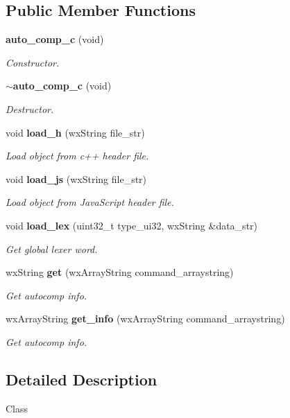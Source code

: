 \subsection*{Public Member Functions}
\begin{DoxyCompactItemize}
\item 
\textbf{ auto\+\_\+comp\+\_\+c} (void)
\begin{DoxyCompactList}\small\item\em Constructor. \end{DoxyCompactList}\item 
\textbf{ $\sim$auto\+\_\+comp\+\_\+c} (void)
\begin{DoxyCompactList}\small\item\em Destructor. \end{DoxyCompactList}\item 
void \textbf{ load\+\_\+h} (wx\+String file\+\_\+str)
\begin{DoxyCompactList}\small\item\em Load object from c++ header file. \end{DoxyCompactList}\item 
void \textbf{ load\+\_\+js} (wx\+String file\+\_\+str)
\begin{DoxyCompactList}\small\item\em Load object from Java\+Script header file. \end{DoxyCompactList}\item 
void \textbf{ load\+\_\+lex} (uint32\+\_\+t type\+\_\+ui32, wx\+String \&data\+\_\+str)
\begin{DoxyCompactList}\small\item\em Get global lexer word. \end{DoxyCompactList}\item 
wx\+String \textbf{ get} (wx\+Array\+String command\+\_\+arraystring)
\begin{DoxyCompactList}\small\item\em Get autocomp info. \end{DoxyCompactList}\item 
wx\+Array\+String \textbf{ get\+\_\+info} (wx\+Array\+String command\+\_\+arraystring)
\begin{DoxyCompactList}\small\item\em Get autocomp info. \end{DoxyCompactList}\end{DoxyCompactItemize}


\subsection{Detailed Description}
Class 

